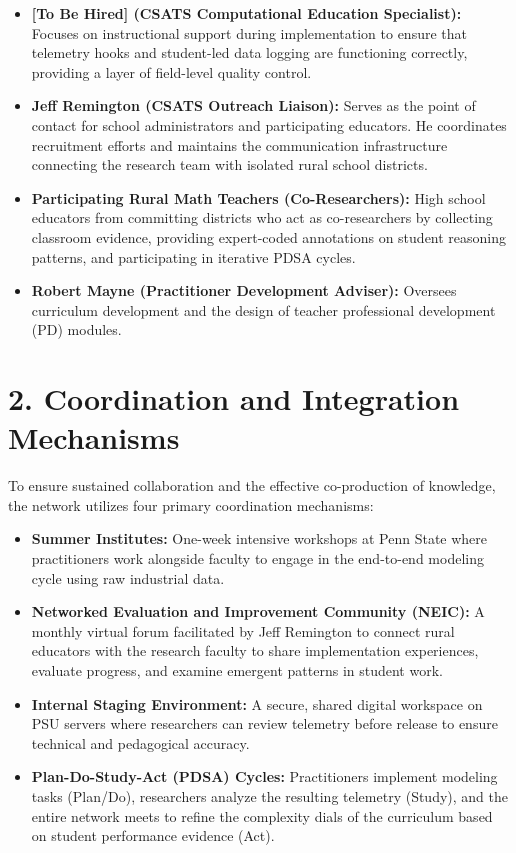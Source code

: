 \documentclass[11pt]{article}
\begin{document}
\begin{itemize}[noitemsep, topsep=2pt]
    \item \textbf{[To Be Hired] (CSATS Computational Education Specialist):} Focuses on instructional support during implementation to ensure that telemetry hooks and student-led data logging are functioning correctly, providing a layer of field-level quality control.
    \item \textbf{Jeff Remington (CSATS Outreach Liaison):} Serves as the point of contact for school administrators and participating educators. He coordinates recruitment efforts and maintains the communication infrastructure connecting the research team with isolated rural school districts.
    \item \textbf{Participating Rural Math Teachers (Co-Researchers):} High school educators from committing districts who act as co-researchers by collecting classroom evidence, providing expert-coded annotations on student reasoning patterns, and participating in iterative PDSA cycles.
    \item \textbf{Robert Mayne (Practitioner Development Adviser):} Oversees curriculum development and the design of teacher professional development (PD) modules.
\end{itemize}

\section*{2. Coordination and Integration Mechanisms}
To ensure sustained collaboration and the effective co-production of knowledge, the network utilizes four primary coordination mechanisms:

\begin{itemize}[noitemsep, topsep=2pt]
    \item \textbf{Summer Institutes:} One-week intensive workshops at Penn State where practitioners work alongside faculty to engage in the end-to-end modeling cycle using raw industrial data.
    \item \textbf{Networked Evaluation and Improvement Community (NEIC):} A monthly virtual forum facilitated by Jeff Remington to connect rural educators with the research faculty to share implementation experiences, evaluate progress, and examine emergent patterns in student work.
    \item \textbf{Internal Staging Environment:} A secure, shared digital workspace on PSU servers where researchers can review telemetry before release to ensure technical and pedagogical accuracy.
    \item \textbf{Plan-Do-Study-Act (PDSA) Cycles:} Practitioners implement modeling tasks (Plan/Do), researchers analyze the resulting telemetry (Study), and the entire network meets to refine the complexity dials of the curriculum based on student performance evidence (Act).
\end{itemize}
\end{document}
